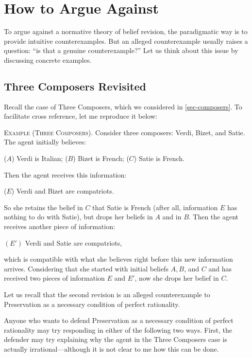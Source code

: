 \section{How to Argue Against}\label{sec-argue-against}

To argue against a normative theory of belief revision, the paradigmatic way is to provide intuitive counterexamples. But an alleged counterexample usually raises a question: ``is that a genuine counterexample?'' Let us think about this issue by discussing concrete examples.

\subsection{Three Composers Revisited}

Recall the case of Three Composers, which we considered in \autoref{sec-composers}. To facilitate cross reference, let me reproduce it below:\op
 
	\xm \textsc{Example (Three Composers).} Consider three composers: Verdi, Bizet, and Satie. The agent initially believes: \op

		\xm ($A$) Verdi is Italian;
		\xm ($B$) Bizet is French;
		\xm ($C$) Satie is French. 

	\ed Then the agent receives this information: \op

		\xm ($E$) Verdi and Bizet are compatriots. 

	\ed So she retains the belief in $C$ that Satie is French (after all, information $E$ has nothing to do with Satie), but drops her beliefs in $A$ and in $B$. Then the agent receives another piece of information: \op

	\xm $(E')$ Verdi and Satie are compatriots,

	\ed which is compatible with what she believes right before this new information arrives. Considering that she started with initial beliefs $A, B$, and $C$ and has received two pieces of information $E$ and $E'$, now she drops her belief in $C$. 

\ed Let us recall that the second revision is an alleged counterexample to Preservation as a necessary condition of perfect rationality. 

Anyone who wants to defend Preservation as a necessary condition of perfect rationality may try responding in either of the following two ways. First, the defender may try explaining why the agent in the Three Composers case is actually irrational---although it is not clear to me how this can be done.

